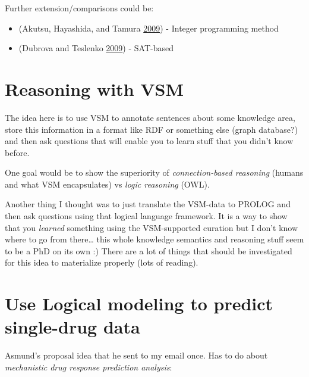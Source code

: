 \documentclass[12pt,]{book}
\providecommand{\tightlist}{%
  \setlength{\itemsep}{0pt}\setlength{\parskip}{0pt}}
\begin{document}
Further extension/comparisons could be:

\begin{itemize}
\tightlist
\item
  (Akutsu, Hayashida, and Tamura \protect\hyperlink{ref-Akutsu2009}{2009}) - Integer programming method
\item
  (Dubrova and Teslenko \protect\hyperlink{ref-Dubrova2009}{2009}) - SAT-based
\end{itemize}

\hypertarget{reasoning-with-vsm}{%
\section{Reasoning with VSM}\label{reasoning-with-vsm}}

The idea here is to use VSM to annotate sentences about some knowledge area,
store this information in a format like RDF or something else (graph database?)
and then ask questions that will enable you to learn stuff that you didn't know
before.

One goal would be to show the superiority of \emph{connection-based reasoning}
(humans and what VSM encapsulates) vs \emph{logic reasoning} (OWL).

Another thing I thought was to just translate the VSM-data to PROLOG
and then ask questions using that logical language framework. It is a way to show
that you \emph{learned} something using the VSM-supported curation but I don't know
where to go from there\ldots{} this whole knowledge semantics and reasoning stuff
seem to be a PhD on its own :) There are a lot of things that should
be investigated for this idea to materialize properly (lots of reading).

\hypertarget{use-logical-modeling-to-predict-single-drug-data}{%
\section{Use Logical modeling to predict single-drug data}\label{use-logical-modeling-to-predict-single-drug-data}}

Asmund's proposal idea that he sent to my email once. Has to do about \emph{mechanistic drug response prediction analysis}:
\end{document}
